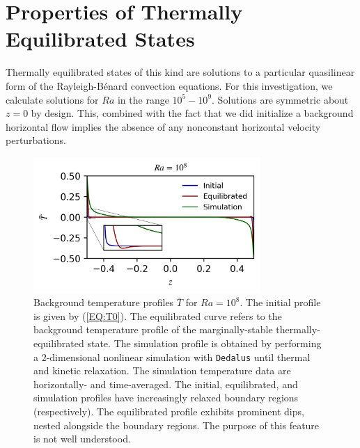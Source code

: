 \documentclass[reprint,amsmath,amssymb,aps]{revtex4-1}
\begin{document}
\section{Properties of Thermally Equilibrated States}\label{sec:properties}
Thermally equilibrated states of this kind are solutions to a particular quasilinear form of the Rayleigh-B\'enard convection equations. For this investigation, we calculate solutions for $Ra$ in the range $10^5 - 10^9$. Solutions are symmetric about $z = 0$ by design. This, combined with the fact that we did initialize a background horizontal flow implies the absence of any nonconstant horizontal velocity perturbations. 

\begin{figure}[h]
    \centering
    \includegraphics[width=3.4in]{T_profs_na.png}
    \caption{Background temperature profiles $\bar{T}$ for $Ra = 10^8$. The initial profile is given by (\ref{EQ:T0}). The equilibrated curve refers to the background temperature profile of the marginally-stable thermally-equilibrated state. The simulation profile is obtained by performing a 2-dimensional nonlinear simulation with \texttt{Dedalus} until thermal and kinetic relaxation. The simulation temperature data are horizontally- and time-averaged. The initial, equilibrated, and simulation profiles have increasingly relaxed boundary regions (respectively). The equilibrated profile exhibits prominent dips, nested alongside the boundary regions. The purpose of this feature is not well understood.}
    \label{fig:T0_profiles}
\end{figure}
\end{document}
